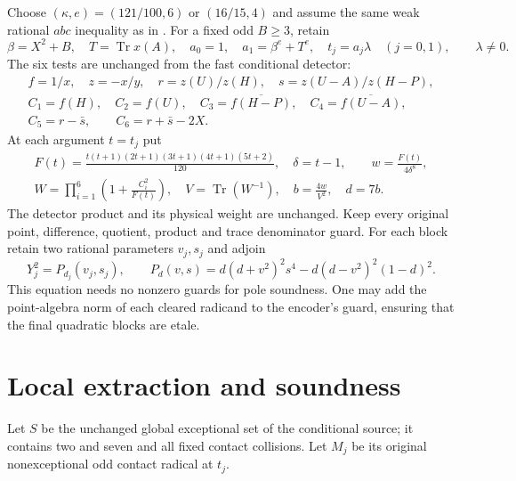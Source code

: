 \documentclass[11pt,a4paper]{article}
\DeclareMathOperator{\Tr}{Tr}\DeclareMathOperator{\Nm}{N}
\begin{document}
Choose $(\kappa,e)=(121/100,6)$ or $(16/15,4)$ and assume the same
weak rational $abc$ inequality as in \cite{Conditional}. For a fixed
odd $B\ge3$, retain
\[
 \beta=X^2+B,\quad T=\Tr x(A),\quad a_0=1,\quad
 a_1=\beta^e+T^e,\quad t_j=a_j\lambda\quad(j=0,1),\qquad\lambda\ne0.
\]
The six tests are unchanged from the fast conditional detector:
\[
 \begin{gathered}
 f=1/x,\quad z=-x/y,\quad r=z(U)/z(H),\quad
 s=z(U-A)/z(H-P),\\
 C_1=f(H),\quad C_2=f(U),\quad C_3=\overline{f(H-P)},\quad
 C_4=\overline{f(U-A)},\\
 C_5=r-\bar s,\qquad C_6=r+\bar s-2X.
 \end{gathered}
\]
At each argument $t=t_j$ put
\begin{equation}\label{eq:detector}
 \begin{gathered}
 F(t)=\frac{t(t+1)(2t+1)(3t+1)(4t+1)(5t+2)}{120},\quad
 \delta=t-1,\qquad w=\frac{F(t)}{4\delta^8},\\
 W=\prod_{i=1}^6\left(1+\frac{C_i^2}{F(t)}\right),\quad
 V=\Tr(W^{-1}),\quad b=\frac{4w}{V^2},\quad d=7b.
 \end{gathered}
\end{equation}
The detector product and its physical weight are unchanged.
Keep every original point, difference, quotient, product and trace
denominator guard.
For each block retain two rational parameters $v_j,s_j$ and adjoin
\begin{equation}\label{eq:pole}
 Y_j^2=P_{d_j}(v_j,s_j),\qquad
 P_d(v,s)=d(d+v^2)^2s^4-d(d-v^2)^2(1-d)^2.
\end{equation}
This equation needs no nonzero guards for pole soundness. One may
add the point-algebra norm of each cleared radicand to the encoder's
guard, ensuring that the final quadratic blocks are etale.

\section{Local extraction and soundness}
Let $S$ be the unchanged global exceptional set of the conditional
source; it contains two and seven and all fixed contact collisions.
Let $M_j$ be its original nonexceptional odd contact radical at $t_j$.
\end{document}
